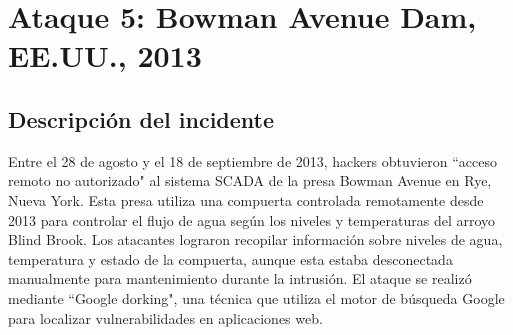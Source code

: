 \newpage
\section{Ataque 5: Bowman Avenue Dam, EE.UU., 2013}

\begin{paracol}{2}
    
    \subsection{Descripción del incidente}

    \colfill
    Entre el 28 de agosto y el 18 de septiembre de 2013, hackers obtuvieron ``acceso remoto no autorizado" al sistema SCADA de la presa Bowman Avenue en Rye, Nueva York. Esta presa utiliza una compuerta controlada remotamente desde 2013 para controlar el flujo de agua según los niveles y temperaturas del arroyo Blind Brook. Los atacantes lograron recopilar información sobre niveles de agua, temperatura y estado de la compuerta, aunque esta estaba desconectada manualmente para mantenimiento durante la intrusión. El ataque se realizó mediante ``Google dorking", una técnica que utiliza el motor de búsqueda Google para localizar vulnerabilidades en aplicaciones web.
    
    \colfill
    
    \switchcolumn


\end{paracol}
